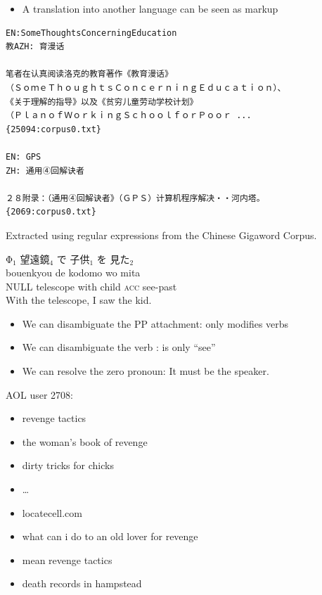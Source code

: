 \documentclass[a4paper,landscape,headrule,footrule,xetex]{foils}
\begin{document}

 \begin{itemize}
 \item A translation into another language can be seen as markup
 \end{itemize}

\begin{verbatim}
EN:SomeThoughtsConcerningEducation	
教AZH: 育漫话

笔者在认真阅读洛克的教育著作《教育漫话》
（ＳｏｍｅＴｈｏｕｇｈｔｓＣｏｎｃｅｒｎｉｎｇＥｄｕｃａｔｉｏｎ）、
《关于理解的指导》以及《贫穷儿童劳动学校计划》
（ＰｌａｎｏｆＷｏｒｋｉｎｇＳｃｈｏｏｌｆｏｒＰｏｏｒ ...
{25094:corpus0.txt}

EN: GPS	
ZH: 通用④回解诀者

２８附录：（通用④回解诀者》（ＧＰＳ）计算机程序解决・・河内塔。
{2069:corpus0.txt}
\end{verbatim}

Extracted using regular expressions from the Chinese Gigaword Corpus.



\begin{exe}
  \ex {}
  \ex \glll Φ$_1$ 望遠鏡$_4$ で 子供$_1$ を 見た$_2$ \\
  {} bouenkyou de kodomo wo mita \\
 NULL telescope with child \textsc{acc} see-past \\
 \trans With the telescope, I saw the kid.
\end{exe}
\begin{itemize}
\item We can disambiguate the PP attachment:  only modifies verbs
\item We can disambiguate the verb :  is only ``see''
\item We can resolve the zero pronoun: It must be the speaker. 
\end{itemize}

AOL user 2708:
\begin{itemize}\addtolength{\itemsep}{-1ex}
\item revenge tactics
\item the woman's book of revenge
\item dirty tricks for chicks
\item \ldots
\item locatecell.com
\item what can i do to an old lover for revenge
\item mean revenge tactics
\item death records in hampstead
\end{itemize}
\end{document}
